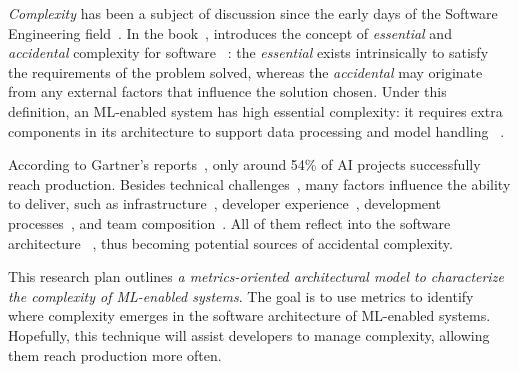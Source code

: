 \emph{Complexity} has been a subject of discussion since the early
days of the Software Engineering field~\parencite{Brooks1975TheMan-Month,
Parnas1985TheSystems}. In the book~,
\citeauthor{Brooks1975TheMan-Month} introduces the concept of
\emph{essential} and \emph{accidental} complexity for software%
~\parencite{Brooks1975TheMan-Month}:
  the \emph{essential} exists intrinsically to satisfy the requirements
  of the problem solved, whereas the \emph{accidental} may originate
  from any external factors that influence the solution chosen.
Under this definition, an ML-enabled system has high essential
complexity: it requires extra components in its architecture to
support data processing and model handling%
~\parencite{Ameisen2020BuildingApplications, Amershi2019SoftwareStudy,
Benton2020MachineApplications}.

According to Gartner's reports~\parencite{Gartner2020,Gartner2022},
only around 54\% of AI projects successfully reach production.
Besides technical challenges~\parencite{Sculley2015HiddenSystems, 
Thung2012AnSystems}, many factors influence the ability to deliver, such as
  infrastructure~\parencite{Davis2019CloudPatterns,Morris2020InfrastructureCode},
  developer experience~\parencite{MartinCleanCode2008,Reilly2022TheChange},
  development processes~\parencite{Nahar2021MoreProjects,
  Shankar2022OperationalizingStudy, Wazir2023MLOps:Review}, and
  team composition~\parencite{Nahar2021MoreProjects,Skelton2019TeamFlow}.
All of them reflect into the software architecture%
~\parencite{Brooks1975TheMan-Month, Ford2021SoftwareParts,
Richards2020FundamentalsApproach}, thus becoming potential
sources of accidental complexity.


This research plan outlines \emph{a metrics-oriented architectural
model to characterize the complexity of ML-enabled systems}.
The goal is to use metrics to identify where complexity
emerges in the software architecture of ML-enabled systems.
Hopefully, this technique will assist developers to manage
complexity, allowing them reach production more often.

